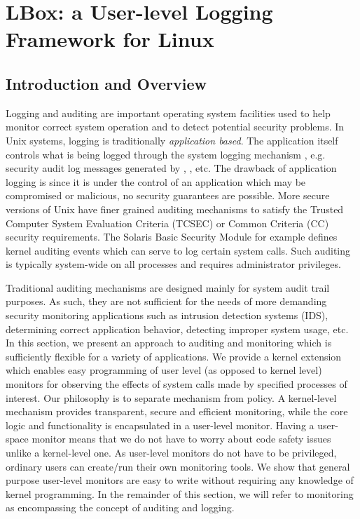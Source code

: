 \section{LBox: a User-level Logging Framework for Linux}

\subsection{Introduction and Overview}


Logging and auditing are important operating system facilities used
to help monitor correct system operation and to detect potential
security problems.
In Unix systems, logging is traditionally {\em application based}.
The application itself controls what is being logged through
the system logging mechanism , e.g.
security audit log messages generated 
by , , etc.
The drawback of application logging is since it is under the
control of an application which may be compromised or malicious,
no security guarantees are possible.
More secure versions of Unix have finer grained auditing mechanisms
to satisfy the Trusted Computer System Evaluation Criteria (TCSEC) or Common
Criteria (CC) security requirements.
The Solaris Basic Security Module \cite{solaris-sec-svc}
for example defines kernel auditing events 
which can serve to log certain system calls.
Such auditing is typically system-wide on all processes and
requires administrator privileges.

Traditional auditing mechanisms are designed mainly for
system audit trail purposes.
As such, they are not sufficient for the needs
of more demanding security monitoring applications
such as intrusion detection systems (IDS), 
determining correct application behavior, detecting improper system usage, etc.
In this section, we present an approach to auditing and monitoring
which is sufficiently flexible for a variety of applications.
We provide a kernel extension which enables easy
programming of user level (as opposed to kernel level) monitors for 
observing the effects of system calls made by specified processes of interest.
Our philosophy is to separate mechanism from policy.
A kernel-level mechanism provides transparent, secure and efficient monitoring,
while the core logic and functionality is encapsulated in a user-level monitor.
Having a user-space monitor means that
we do not have to worry about code safety
issues unlike a kernel-level one.
As user-level monitors do not have to be privileged, 
ordinary users can create/run their own monitoring tools.
We show that general purpose user-level monitors are easy to write 
without requiring any knowledge of kernel programming. 
In the remainder of this section, we will refer to monitoring as encompassing
the concept of auditing and logging.

